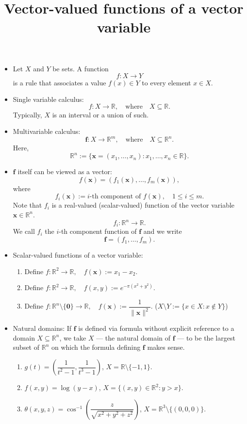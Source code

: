 \documentclass{amsart}
\newcommand{\lra}{\longrightarrow}
\newcommand{\RR}{\mathbb{R}}
\newcommand{\bx}{\mathbf{x}}
\newcommand{\bzero}{\mathbf{0}}
\renewcommand{\bf}{\mathbf{f}}
\begin{document}
\title{Vector-valued functions of a vector variable}
\maketitle

\begin{itemize}
\setlength\itemsep{1em}
\item Let $X$ and $Y$ be sets. A function
\[
  f:X\lra Y
\]
is a rule that associates a value $f(x)\in Y$ to every element $x\in X$.

\item Single variable calculus:
\[
 f:X\lra \RR,\quad\text{where}\quad
 X\subseteq\RR. 
\]
Typically, $X$ is an interval or a union of such.

\item Multivariable calculus:
\[
  \bf:X\lra \RR^m,\quad\text{where}\quad
X\subseteq \RR^n.
\]
Here,
\[
  \RR^n:=\{\bx=(x_1,\ldots,x_n) : x_1,\ldots,x_n\in\RR\}.
  \]

\item $\bf$ itself can be viewed as a vector:
\[
  f(\bx) = (f_1(\bx),\ldots,f_m(\bx)),
\]
where
\[
  f_i(\bx):=\text{$i$-th component of $f(\bx)$},\quad
  1\leq i\leq m.
  \]
Note that $f_i$ is a real-valued (scalar-valued)
function of the vector variable $\bx\in\RR^n$.
\[
  f_i:\RR^n\lra\RR.
  \]
We call $f_i$ the $i$-th component function of $\bf$ and we write
\[
\bf=(f_1,\ldots,f_m).
\]

\item Scalar-valued functions of a vector variable:

\bigskip
\begin{enumerate}
\setlength{\itemsep}{1em}
\item Define $f:\RR^2\lra \RR,\quad f(\bx) := x_1-x_2$.
\item Define $f:\RR^2\lra \RR,\quad f(x,y) := e^{-\pi(x^2+y^2)}$.
\item Define $f:\RR^n\setminus\{\bzero\}\lra \RR,\quad f(\bx) := \dfrac1{\|\bx\|^2}$.
($X\setminus Y:= \{x\in X : x\notin Y\}$)
\end{enumerate}

\item Natural domains: If $\bf$ is defined via formula without explicit reference to a domain
$X\subseteq \RR^n$, we take $X$ --- the natural domain of $\bf$ --- to be the largest subset
of $\RR^n$ on which the formula defining $\bf$ makes sense.

\bigskip
\begin{enumerate}
\setlength{\itemsep}{1em}
\item $g(t) = \left(\dfrac1{t^2-1},\dfrac1{t^3-1}\right)$, $X=\RR\setminus\{-1, 1\}$.
\item $f(x,y)=\log(y-x)$, $X=\{(x,y)\in\RR^2 : y>x\}$.
\item $\theta(x,y,z)=\cos^{-1}\left(\dfrac{z}{\sqrt{x^2+y^2+z^2}}\right)$, $X=\RR^3\setminus\{(0,0,0)\}$.
\end{enumerate}
\end{itemize}
\end{document}

